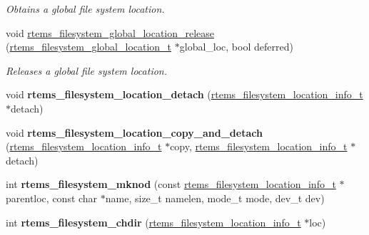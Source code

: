 \begin{DoxyCompactItemize}
\begin{DoxyCompactList}\small\item\em Obtains a global file system location. \end{DoxyCompactList}\item 
void \mbox{\hyperlink{group__LibIOInternal_ga66aa5e6d0bbf4c03b533deac66fb328f}{rtems\+\_\+filesystem\+\_\+global\+\_\+location\+\_\+release}} (\mbox{\hyperlink{structrtems__filesystem__global__location__t}{rtems\+\_\+filesystem\+\_\+global\+\_\+location\+\_\+t}} $\ast$global\+\_\+loc, bool deferred)
\begin{DoxyCompactList}\small\item\em Releases a global file system location. \end{DoxyCompactList}\item 
\mbox{\label{group__LibIOInternal_gab08185b203032392628c233f2de28be1}} 
void {\bfseries rtems\+\_\+filesystem\+\_\+location\+\_\+detach} (\mbox{\hyperlink{group__LibIO_ga3252b3d31ee3c49ffff0b7604a676864}{rtems\+\_\+filesystem\+\_\+location\+\_\+info\+\_\+t}} $\ast$detach)
\item 
\mbox{\label{group__LibIOInternal_ga95931f996614b5174c5cc83c56940809}} 
void {\bfseries rtems\+\_\+filesystem\+\_\+location\+\_\+copy\+\_\+and\+\_\+detach} (\mbox{\hyperlink{group__LibIO_ga3252b3d31ee3c49ffff0b7604a676864}{rtems\+\_\+filesystem\+\_\+location\+\_\+info\+\_\+t}} $\ast$copy, \mbox{\hyperlink{group__LibIO_ga3252b3d31ee3c49ffff0b7604a676864}{rtems\+\_\+filesystem\+\_\+location\+\_\+info\+\_\+t}} $\ast$detach)
\item 
\mbox{\label{group__LibIOInternal_ga1796d4bcadab6d551343ac7cdc0a38a3}} 
int {\bfseries rtems\+\_\+filesystem\+\_\+mknod} (const \mbox{\hyperlink{group__LibIO_ga3252b3d31ee3c49ffff0b7604a676864}{rtems\+\_\+filesystem\+\_\+location\+\_\+info\+\_\+t}} $\ast$parentloc, const char $\ast$name, size\+\_\+t namelen, mode\+\_\+t mode, dev\+\_\+t dev)
\item 
\mbox{\label{group__LibIOInternal_ga6584c557ffbfc6b6069414b8f306663d}} 
int {\bfseries rtems\+\_\+filesystem\+\_\+chdir} (\mbox{\hyperlink{group__LibIO_ga3252b3d31ee3c49ffff0b7604a676864}{rtems\+\_\+filesystem\+\_\+location\+\_\+info\+\_\+t}} $\ast$loc)
\item 
\mbox{\label{group__LibIOInternal_gaa998746e0b3bd538b0d0a85c95ffcf8f}} 

\end{DoxyCompactItemize}
